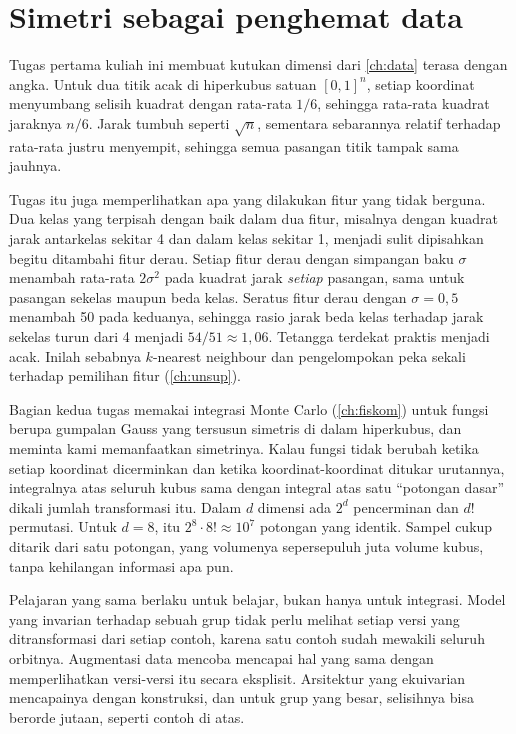 \section{Simetri sebagai penghemat data}

Tugas pertama kuliah ini membuat kutukan dimensi dari \cref{ch:data} terasa dengan angka. Untuk dua titik acak di hiperkubus satuan
$[0,1]^n$, setiap koordinat menyumbang selisih kuadrat dengan rata-rata $1/6$, sehingga rata-rata kuadrat jaraknya $n/6$. Jarak tumbuh
seperti $\sqrt n$, sementara sebarannya relatif terhadap rata-rata justru menyempit, sehingga semua pasangan titik tampak sama jauhnya.

Tugas itu juga memperlihatkan apa yang dilakukan fitur yang tidak berguna. Dua kelas yang terpisah dengan baik dalam dua fitur,
misalnya dengan kuadrat jarak antarkelas sekitar 4 dan dalam kelas sekitar 1, menjadi sulit dipisahkan begitu ditambahi fitur derau.
Setiap fitur derau dengan simpangan baku $\sigma$ menambah rata-rata $2\sigma^2$ pada kuadrat jarak \emph{setiap} pasangan, sama untuk
pasangan sekelas maupun beda kelas. Seratus fitur derau dengan $\sigma=0{,}5$ menambah 50 pada keduanya, sehingga rasio jarak beda kelas
terhadap jarak sekelas turun dari 4 menjadi $54/51\approx1{,}06$. Tetangga terdekat praktis menjadi acak. Inilah sebabnya
$k$-nearest neighbour dan pengelompokan peka sekali terhadap pemilihan fitur (\cref{ch:unsup}).

Bagian kedua tugas memakai integrasi Monte Carlo (\cref{ch:fiskom}) untuk fungsi berupa gumpalan Gauss yang tersusun simetris di
dalam hiperkubus, dan meminta kami memanfaatkan simetrinya. Kalau fungsi tidak berubah ketika setiap koordinat dicerminkan dan ketika
koordinat-koordinat ditukar urutannya, integralnya atas seluruh kubus sama dengan integral atas satu ``potongan dasar'' dikali jumlah
transformasi itu. Dalam $d$ dimensi ada $2^d$ pencerminan dan $d!$ permutasi. Untuk $d=8$, itu $2^8\cdot8!\approx10^7$ potongan yang
identik. Sampel cukup ditarik dari satu potongan, yang volumenya sepersepuluh juta volume kubus, tanpa kehilangan informasi apa pun.

Pelajaran yang sama berlaku untuk belajar, bukan hanya untuk integrasi. Model yang invarian terhadap sebuah grup tidak perlu melihat
setiap versi yang ditransformasi dari setiap contoh, karena satu contoh sudah mewakili seluruh orbitnya. Augmentasi data mencoba
mencapai hal yang sama dengan memperlihatkan versi-versi itu secara eksplisit. Arsitektur yang ekuivarian mencapainya dengan
konstruksi, dan untuk grup yang besar, selisihnya bisa berorde jutaan, seperti contoh di atas.

